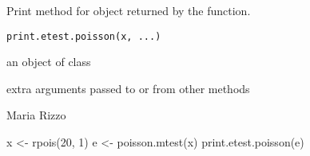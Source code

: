 \begin{Description}\relax
Print method for  object returned by the 
 function.
\end{Description}
\begin{Usage}
\begin{verbatim}
print.etest.poisson(x, ...)
\end{verbatim}
\end{Usage}
\begin{Arguments}
\begin{ldescription}
\item[\code{x}] an object of class  
\item[\code{...}] extra arguments passed to or from other methods 
\end{ldescription}
\end{Arguments}
\begin{Author}\relax
Maria Rizzo 
\end{Author}
\begin{SeeAlso}\relax
{}
\end{SeeAlso}
\begin{Examples}
\begin{ExampleCode}
 x <- rpois(20, 1)
 e <- poisson.mtest(x)
 print.etest.poisson(e)
 \end{ExampleCode}
\end{Examples}


